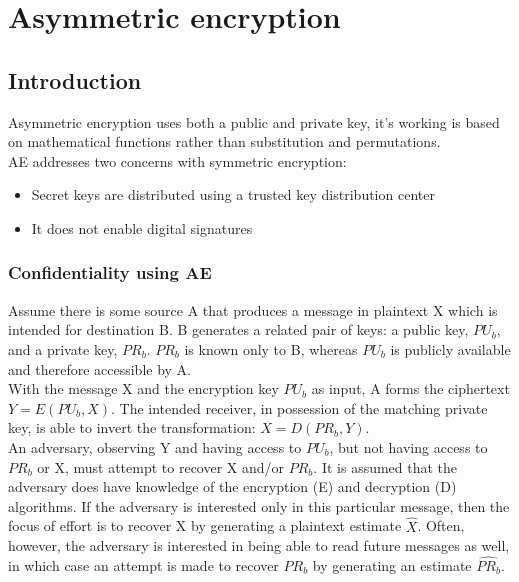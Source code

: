 \documentclass[12pt]{article}
\begin{document}
 \newpage
 \section{Asymmetric encryption}
 \subsection{Introduction}
 Asymmetric encryption uses both a public and private key, it's working is based on mathematical functions rather than substitution and permutations.\\
 AE addresses two concerns with symmetric encryption:
 \begin{itemize}
 	\item Secret keys are distributed using a trusted key distribution center
 	\item It does not enable digital signatures
 \end{itemize}
 \subsubsection{Confidentiality using AE}
 Assume there is some source A that produces a message in plaintext X which is intended for destination B. B generates a related pair of keys: a public key, $PU_b$, and a private key, $PR_b$. $PR_b$ is known only to B, whereas $PU_b$ is publicly available and therefore accessible by A.\\ With the message X and the encryption key $PU_b$ as input, A forms the ciphertext $Y = E(PU_b, X)$. The intended receiver, in possession of the matching private key, is able to invert the transformation: $X = D(PR_b,Y)$.\\ 
 An adversary, observing Y and having access to $PU_b$, but not having access to $PR_b$ or X, must attempt to recover X and/or $PR_b$. It is assumed that the adversary does have knowledge  of  the  encryption  (E)  and decryption  (D) algorithms.  If  the adversary is interested only in this particular message, then the focus of effort is to recover X by generating a plaintext estimate $\widehat{X}$. Often, however, the adversary is interested in being able to read future messages as well, in which case an attempt is made to recover $PR_b$ by generating an estimate $\widehat{PR_b}$.
 
\end{document}
